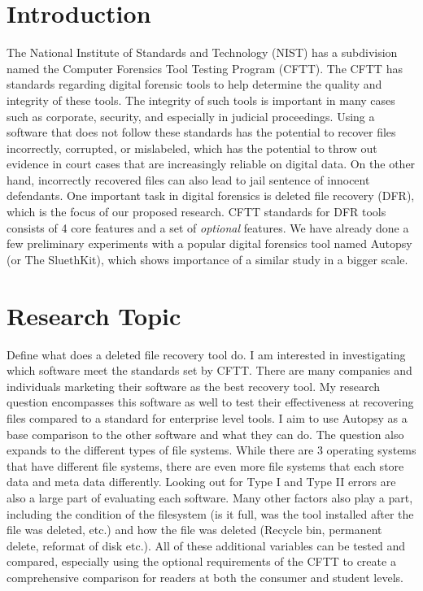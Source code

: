 \section{Introduction}
The National Institute of Standards and Technology (NIST) has a subdivision named the Computer Forensics Tool Testing Program (CFTT). 
The CFTT has standards regarding digital forensic tools to help determine the quality and integrity of these tools. The integrity 
of such tools is important in many cases such as corporate, security, and especially in judicial proceedings. 
Using a software that does not follow these standards has the potential to recover files incorrectly, corrupted, or 
mislabeled, which has the potential to throw out evidence in court cases that are increasingly reliable on digital data. 
On the other hand, incorrectly recovered files can also lead to jail sentence of innocent defendants. One important 
task in digital forensics is deleted file recovery (DFR), which is the focus of our proposed research. 
CFTT standards for DFR tools consists of 4 core features and a set of \emph{optional} features. 
We have already done a few preliminary experiments with a popular digital forensics tool named Autopsy (or The SluethKit\cite{autopsy2019}), which 
shows importance of a similar study in a bigger scale.

\section{Research Topic}
Define what does a deleted file recovery tool do. I am interested in investigating which software meet the standards 
set by CFTT. There are many companies and individuals marketing their software as the best recovery tool. My 
research question encompasses this software as well to test their effectiveness at recovering files compared to a standard for enterprise 
level tools. I aim to use Autopsy as a base comparison to the other software and what they can do. The question 
also expands to the different types of file systems. While there are 3 operating systems that have different file 
systems, there are even more file systems that each store data and meta data differently. Looking out for Type I and 
Type II errors are also a large part of evaluating each software. Many other factors also play a part, including the 
condition of the filesystem (is it full, was the tool installed after the file was deleted, etc.) and how the file was 
deleted (Recycle bin, permanent delete, reformat of disk etc.). 
All of these additional variables can be tested and compared, especially using 
the optional requirements of the CFTT to create a comprehensive comparison for readers at both the consumer and student levels.
